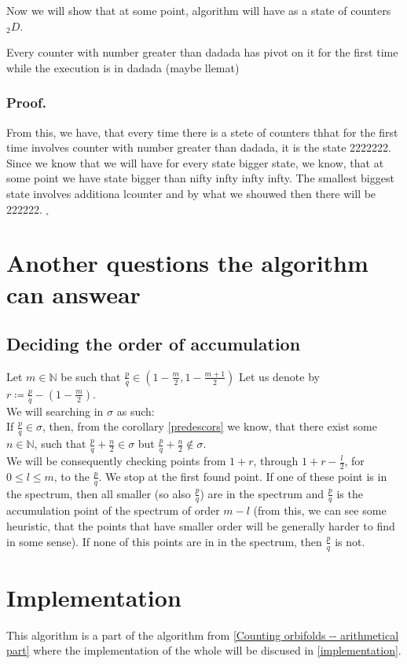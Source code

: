 Now we will show that at some point, algorithm will have as a state of counters $_2D$. 

\begin{lemma}
Every counter with number greater than dadada 
has pivot on it for the first time while the execution is in dadada (maybe llemat)
\end{lemma}
\subsubsection{Proof.}

From this, we have, that every time there is a stete of counters thhat for the first time 
involves counter with number greater than dadada, it is the state 2222222. 
Since we know that we will have for every state bigger state, we know, that at some point we have 
state bigger than nifty infty infty infty. The smallest biggest state involves additiona lcounter 
and by what we shouwed then there will be 222222. $_\square$





\section{Another questions the algorithm can answear}
\subsection{Deciding the order of accumulation}
Let $m \in \mathbb{N}$ be such that $\frac{p}{q} \in (1-\frac{m}{2},1-
\frac{m+1}{2})$
Let us denote by $r \coloneqq \frac{p}{q} - (1-\frac{m}{2})$. \\ 

We will searching in $\sigma$ as such: \\

If $\frac{p}{q} \in \sigma$, then, from the corollary \ref{predescors} we know, that there 
exist some $n \in \mathbb{N}$, such that $\frac{p}{q} + \frac{n}{2} \in \sigma$ but 
$\frac{p}{q} + \frac{n}{2} \not\in \sigma$. \\

We will be consequently checking points from $1+r$, through $1+r-\frac{l}{2}$, for 
$0 \leq l \leq m$, to the $\frac{p}{q}$. We stop at the first found point. 
If one of these point is in the spectrum, then all smaller (so also $\frac{p}{q}$) are in 
the spectrum and $\frac{p}{q}$ is the accumulation point of the spectrum of order $m-l$ 
(from this, 
we can see some heuristic, that the points that have smaller order will be generally 
harder to find in some sense). If none of this points are in in the spectrum, then $\frac{p}{q}$ 
is not. \\

\section{Implementation}
This algorithm is a part of the algorithm from \ref{Counting orbifolds -- arithmetical part} 
where the implementation of the whole will be discused in \ref{implementation}.
